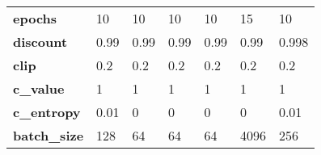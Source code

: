 \begin{tabular}{lllllll}
\textbf{epochs           } &       10 &         10 &        10 &      10 &           15 &           10 \\
\textbf{discount         } &     0.99 &       0.99 &      0.99 &    0.99 &         0.99 &        0.998 \\
\textbf{clip             } &      0.2 &        0.2 &       0.2 &     0.2 &          0.2 &          0.2 \\
\textbf{c\_value          } &        1 &          1 &         1 &       1 &            1 &            1 \\
\textbf{c\_entropy        } &     0.01 &          0 &         0 &       0 &            0 &         0.01 \\
\textbf{batch\_size       } &      128 &         64 &        64 &      64 &         4096 &          256 \\
\bottomrule
\end{tabular}
